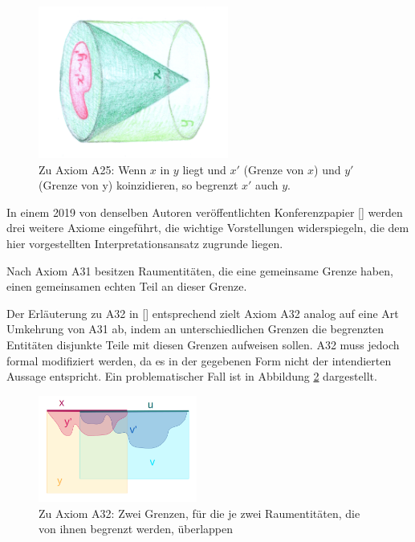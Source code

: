     \begin{figure}[ht]
        \centering
        \includegraphics[height=5cm]{abb/a25.png}
        \caption[Zu Axiom 25]{Zu Axiom A25: Wenn $x$ in $y$ liegt und $x'$ (Grenze von $x$) und $y'$ (Grenze von y) koinzidieren, so begrenzt $x'$ auch $y$.}
        \label{fig:A25}
    \end{figure}
    
    In
    einem 2019 von denselben Autoren veröffentlichten Konferenzpapier [\cite{baumann-r-2019--a}] werden drei weitere Axiome eingeführt, die wichtige Vorstellungen widerspiegeln, die dem hier vorgestellten Interpretationsansatz zugrunde liegen.
    
    Nach
    Axiom A31 besitzen Raumentitäten, die eine gemeinsame Grenze haben, einen gemeinsamen echten Teil an dieser Grenze.
    
    Der
    Erläuterung zu A32 in [\cite{baumann-r-2019--a}] entsprechend zielt Axiom A32
		analog auf eine Art Umkehrung von A31 ab,
		indem an unterschiedlichen Grenzen die begrenzten Entitäten disjunkte Teile 
		mit diesen Grenzen aufweisen sollen.
    A32 muss jedoch formal modifiziert werden, da es in der gegebenen Form nicht der intendierten Aussage entspricht. Ein problematischer Fall ist in Abbildung \ref{fig:a32} dargestellt.
    
    \begin{figure}[ht]
        \centering
        \includegraphics[height=3.5cm]{abb/a32.png}
        \caption[Zu Axiom 32]{Zu Axiom A32: Zwei Grenzen, für die je zwei Raumentitäten, die von ihnen begrenzt werden, überlappen}
        \label{fig:a32}
    \end{figure}
    
